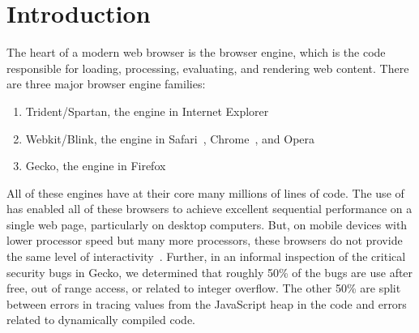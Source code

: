 \section{Introduction}
\label{sec:intro}
The heart of a modern web browser is the browser engine, which is the code responsible
for loading, processing, evaluating, and rendering web content.
There are three major browser engine families:
\begin{enumerate}
\item Trident/Spartan, the engine in Internet Explorer~\cite{IE}
\item Webkit\cite{WEBKIT}/Blink, the engine in Safari~\cite{SAFARI}, Chrome~\cite{CHROME}, and Opera~\cite{OPERA}
\item Gecko, the engine in Firefox~\cite{FIREFOX}
\end{enumerate}
All of these engines have at their core many millions of lines of \Cplusplus{} code.
The use of \Cplusplus{} has enabled all of these browsers to achieve excellent sequential
performance on a single web page, particularly on desktop computers.
But, on mobile devices with lower processor speed but many more processors, these browsers
do not provide the same level of interactivity~\cite{parallelizing-web-pages,ZOOMM}.
Further, in an informal inspection of the critical security bugs in Gecko, we determined that
roughly 50\% of the bugs are use after free, out of range access, or related to integer
overflow.
The other 50\% are split between errors in tracing values from the JavaScript heap in the
\Cplusplus{} code and errors related to dynamically compiled code.

